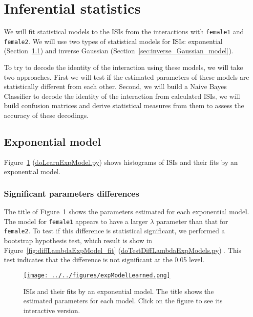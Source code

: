 \documentclass[10pt]{article}
\begin{document}
\section{Inferential statistics}
\label{sec:inferential_statistics}

We will fit statistical models to the ISIs from the interactions with \texttt{female1} and \texttt{female2}. We will use two types of statistical models for ISIs: exponential (Section~\ref{sec:exponential_model}) and inverse Gaussian (Section~\ref{sec:inverse_Gaussian_model}).

To try to decode the identity of the interaction using these models, we will take two approaches. First we will test if the estimated parameters of these models are statistically different from each other. Second, we will build a Naive Bayes Classifier to decode the identity of the interaction from calculated ISIs, we will build confusion matrices and derive statistical measures from them to assess the accuracy of these decodings.

\subsection{Exponential model}
\label{sec:exponential_model}

Figure~\ref{fig:exponential_model_fit} (\href{https://github.com/joacorapela/singleNeuronSpikesAnalysisTutorial/blob/master/code/scripts/doLearnExpModel.py}{doLearnExpModel.py}) shows histograms of ISIs and
their fits by an exponential model. 

\subsubsection{Significant parameters differences}

The title of Figure~\ref{fig:exponential_model_fit} shows the
parameters estimated for each exponential model. The model for
\texttt{female1} appears to have a larger $\lambda$ parameter than that
for \texttt{female2}. To test if this difference is statistical
significant, we performed a bootstrap hypothesis test, which result
is show in Figure~\ref{fig:diffLambdaExpModel_fit} (\href{https://github.com/joacorapela/singleNeuronSpikesAnalysisTutorial/blob/master/code/scripts/doTestDiffLambdaExpModels.py}{doTestDiffLambdaExpModels.py}) . This test
indicates that the difference is not significant at the 0.05 level.

\begin{figure}
    \href{http://www.gatsby.ucl.ac.uk/~rapela/singleNeuronSpikesAnalysisTutorial/figures/expModelLearned.html}{\texttt{[image: ../../figures/expModelLearned.png]}}
    \caption{ISIs and their fits by an exponential model. The title shows the estimated parameters for each model. Click on the figure to see its interactive version.}
    \label{fig:exponential_model_fit}
\end{figure}
\end{document}
